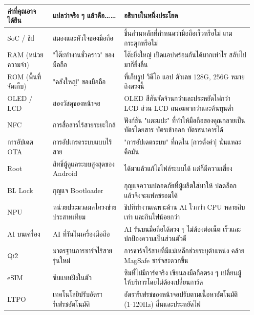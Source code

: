 
\begin{center}
\begin{tabularx}{\linewidth}{|X|X|X|}
\hline
\textbf{คำที่คุณอาจได้ยิน} & \textbf{แปลว่าจริง ๆ แล้วคือ……} & \textbf{อธิบายในหนึ่งประโยค} \tabularnewline
\hline
SoC / ชิป & สมองและหัวใจของมือถือ & ชิ้นส่วนหลักที่กำหนดว่ามือถือเร็วหรือไม่ เกมกระตุกหรือไม่ \tabularnewline
RAM (หน่วยความจำ) & "โต๊ะทำงานชั่วคราว" ของมือถือ & โต๊ะยิ่งใหญ่ เปิดแอปพร้อมกันได้มากเท่าไร สลับไปมาก็ยิ่งลื่น \tabularnewline
ROM (พื้นที่จัดเก็บ) & "คลังใหญ่" ของมือถือ & ที่เก็บรูป วิดีโอ แอป ตัวเลข 128G, 256G หมายถึงตรงนี้ \tabularnewline
OLED / LCD & สองวัสดุของหน้าจอ & OLED สีสันจัดจ้านกว่าและประหยัดไฟกว่า LCD ส่วน LCD ถนอมตากว่าและต้นทุนต่ำ \tabularnewline
NFC & การสื่อสารไร้สายระยะใกล้ & ฟังก์ชัน "แตะแปะ" ที่ทำให้มือถือของคุณกลายเป็นบัตรโดยสาร บัตรเข้าออก บัตรธนาคารได้ \tabularnewline
การอัปเดต OTA & การอัปเกรดระบบแบบไร้สาย & "การอัปเดตระบบ" ที่กดใน [การตั้งค่า] นั่นแหละคือมัน \tabularnewline
Root & สิทธิ์ผู้ดูแลระบบสูงสุดของ Android & ได้มาแล้วแก้ไขไฟล์ระบบได้ แต่ก็มีความเสี่ยง \tabularnewline
BL Lock & กุญแจ Bootloader & กุญแจความปลอดภัยที่ผู้ผลิตใส่มาให้ ปลดล็อกแล้วจึงจะแฟลชรอมได้ \tabularnewline
NPU & หน่วยประมวลผลโครงข่ายประสาทเทียม & ชิปที่ทำงานเฉพาะด้าน AI ไวกว่า CPU หลายสิบเท่า และกินไฟน้อยกว่า \tabularnewline
AI บนเครื่อง & AI ที่รันในเครื่องมือถือ & AI รันบนมือถือได้ตรง ๆ ไม่ต้องต่อเน็ต เร็วและปกป้องความเป็นส่วนตัวดี \tabularnewline
Qi2 & มาตรฐานการชาร์จไร้สายรุ่นใหม่ & การชาร์จไร้สายที่มีแม่เหล็กช่วยระบุตำแหน่ง คล้าย MagSafe ชาร์จสะดวกขึ้น \tabularnewline
eSIM & ซิมแบบฝังในตัว & ซิมที่ไม่มีการ์ดจริง เขียนลงมือถือตรง ๆ เปลี่ยนผู้ให้บริการโดยไม่ต้องเปลี่ยนการ์ด \tabularnewline
LTPO & เทคโนโลยีปรับอัตรารีเฟรชอัตโนมัติ & อัตรารีเฟรชของหน้าจอปรับตามเนื้อหาอัตโนมัติ (1-120Hz) ลื่นและประหยัดไฟ \tabularnewline
\hline
\end{tabularx}
\end{center}
